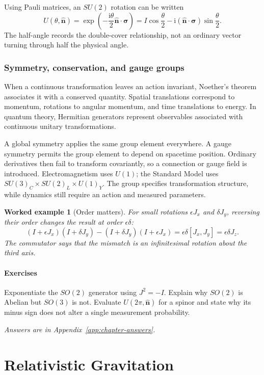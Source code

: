 \documentclass[11pt,oneside]{book}
\newcommand{\ii}{\mathrm{i}}
\newcommand{\vect}[1]{\boldsymbol{#1}}
\theoremstyle{reviewstyle}
\newtheorem{example}{Worked example}[chapter]
\newcommand{\learningcheck}[1]{\subsection*{Exercises}\noindent #1\par\smallskip\noindent\emph{Answers are in Appendix~\ref{app:chapter-answers}.}}
\begin{document}
Using Pauli matrices, an $SU(2)$ rotation can be written
\begin{equation}
U(\theta,\hat{\vect n})=\exp\left(-\frac{\ii\theta}{2}\hat{\vect n}\cdot\vect\sigma\right)
=I\cos\frac\theta2-\ii(\hat{\vect n}\cdot\vect\sigma)\sin\frac\theta2.
\end{equation}
The half-angle records the double-cover relationship, not an ordinary vector turning through half the physical angle.

\section{Symmetry, conservation, and gauge groups}
When a continuous transformation leaves an action invariant, Noether's theorem associates it with a conserved quantity. Spatial translations correspond to momentum, rotations to angular momentum, and time translations to energy. In quantum theory, Hermitian generators represent observables associated with continuous unitary transformations.

A global symmetry applies the same group element everywhere. A gauge symmetry permits the group element to depend on spacetime position. Ordinary derivatives then fail to transform covariantly, so a connection or gauge field is introduced. Electromagnetism uses $U(1)$; the Standard Model uses $SU(3)_C\times SU(2)_L\times U(1)_Y$. The group specifies transformation structure, while dynamics still require an action and measured parameters.

\begin{example}[Order matters]
For small rotations $\epsilon J_x$ and $\delta J_y$, reversing their order changes the result at order $\epsilon\delta$:
\begin{equation}
(I+\epsilon J_x)(I+\delta J_y)-(I+\delta J_y)(I+\epsilon J_x)
=\epsilon\delta[J_x,J_y]=\epsilon\delta J_z.
\end{equation}
The commutator says that the mismatch is an infinitesimal rotation about the third axis.
\end{example}

\learningcheck{Exponentiate the $SO(2)$ generator using $J^2=-I$. Explain why $SO(2)$ is Abelian but $SO(3)$ is not. Evaluate $U(2\pi,\hat{\vect n})$ for a spinor and state why its minus sign does not alter a single measurement probability.}

\part{Relativistic Gravitation}
\end{document}
